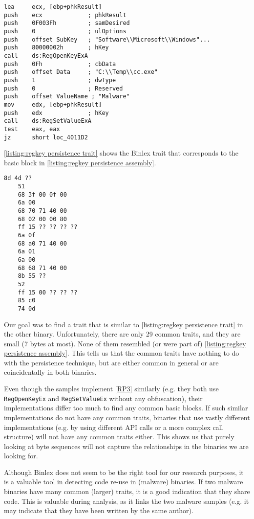 \begin{minipage}{0.9\textwidth}
\begin{lstlisting}[captionpos=b, caption={A basic block, dissassembled by IDA Pro, that implements \autoref{RP3}.}, label={listing:regkey persistence assembly}]
lea     ecx, [ebp+phkResult]
push    ecx             ; phkResult
push    0F003Fh         ; samDesired
push    0               ; ulOptions
push    offset SubKey   ; "Software\\Microsoft\\Windows"...
push    80000002h       ; hKey
call    ds:RegOpenKeyExA
push    0Fh             ; cbData
push    offset Data     ; "C:\\Temp\\cc.exe"
push    1               ; dwType
push    0               ; Reserved
push    offset ValueName ; "Malware"
mov     edx, [ebp+phkResult]
push    edx             ; hKey
call    ds:RegSetValueExA
test    eax, eax
jz      short loc_4011D2
\end{lstlisting}
\end{minipage}

\autoref{listing:regkey persistence trait} shows the Binlex trait that corresponds to the basic block in \autoref{listing:regkey persistence assembly}.

\begin{lstlisting}[captionpos=b, caption={The Binlex trait corresponding to the assembly in \autoref{listing:regkey persistence assembly}.}, label={listing:regkey persistence trait}]
    8d 4d ??
    51
    68 3f 00 0f 00
    6a 00
    68 70 71 40 00
    68 02 00 00 80
    ff 15 ?? ?? ?? ??
    6a 0f
    68 a0 71 40 00
    6a 01
    6a 00
    68 68 71 40 00
    8b 55 ??
    52
    ff 15 00 ?? ?? ??
    85 c0
    74 0d
\end{lstlisting}

Our goal was to find a trait that is similar to \autoref{listing:regkey persistence trait} in the other binary. Unfortunately, there are only 29 common traits, and they are small (7 bytes at most). None of them resembled (or were part of) \autoref{listing:regkey persistence assembly}. This tells us that the common traits have nothing to do with the persistence technique, but are either common in general or are coincidentally in both binaries.

Even though the samples implement \autoref{RP3} similarly (e.g. they both use \texttt{RegOpenKeyEx} and \texttt{RegSetValueEx} without any obfuscation), their implementations differ too much to find any common basic blocks. If such similar implementations do not have any common traits, binaries that use vastly different implementations (e.g. by using different API calls or a more complex call structure) will not have any common traits either. This shows us that purely looking at byte sequences will not capture the relationships in the binaries we are looking for.

Although Binlex does not seem to be the right tool for our research purposes, it is a valuable tool in detecting code re-use in (malware) binaries. If two malware binaries have many common (larger) traits, it is a good indication that they share code. This is valuable during analysis, as it links the two malware samples (e.g. it may indicate that they have been written by the same author).
